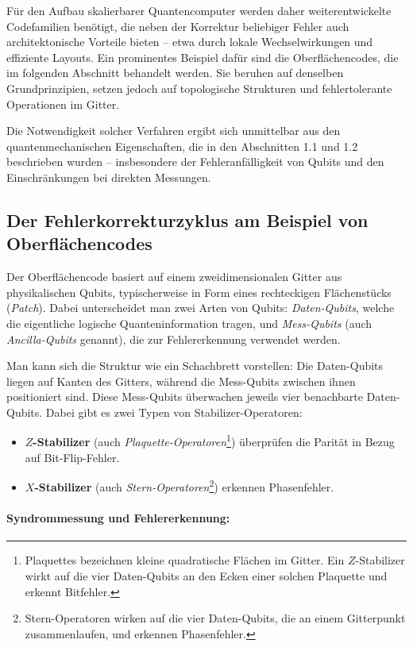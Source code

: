 Für den Aufbau skalierbarer Quantencomputer werden daher weiterentwickelte Codefamilien benötigt, die neben der Korrektur beliebiger Fehler auch architektonische Vorteile bieten – etwa durch lokale Wechselwirkungen und effiziente Layouts. Ein prominentes Beispiel dafür sind die Oberflächencodes, die im folgenden Abschnitt behandelt werden. Sie beruhen auf denselben Grundprinzipien, setzen jedoch auf topologische Strukturen und fehlertolerante Operationen im Gitter.

Die Notwendigkeit solcher Verfahren ergibt sich unmittelbar aus den quantenmechanischen Eigenschaften, die in den Abschnitten 1.1 und 1.2 beschrieben wurden – insbesondere der Fehleranfälligkeit von Qubits und den Einschränkungen bei direkten Messungen.

\subsection{Der Fehlerkorrekturzyklus am Beispiel von Oberflächencodes}

Der Oberflächencode basiert auf einem zweidimensionalen Gitter aus physikalischen Qubits, typischerweise in Form eines rechteckigen Flächenstücks (\emph{Patch}). Dabei unterscheidet man zwei Arten von Qubits: \emph{Daten-Qubits}, welche die eigentliche logische Quanteninformation tragen, und \emph{Mess-Qubits} (auch \emph{Ancilla-Qubits} genannt), die zur Fehlererkennung verwendet werden.

Man kann sich die Struktur wie ein Schachbrett vorstellen: Die Daten-Qubits liegen auf Kanten des Gitters, während die Mess-Qubits zwischen ihnen positioniert sind. Diese Mess-Qubits überwachen jeweils vier benachbarte Daten-Qubits. Dabei gibt es zwei Typen von Stabilizer-Operatoren:
\begin{itemize}
  \item \textbf{\(Z\)-Stabilizer} (auch \emph{Plaquette-Operatoren}\footnote{Plaquettes bezeichnen kleine quadratische Flächen im Gitter. Ein \(Z\)-Stabilizer wirkt auf die vier Daten-Qubits an den Ecken einer solchen Plaquette und erkennt Bitfehler.}) überprüfen die Parität in Bezug auf Bit-Flip-Fehler.
  \item \textbf{\(X\)-Stabilizer} (auch \emph{Stern-Operatoren}\footnote{Stern-Operatoren wirken auf die vier Daten-Qubits, die an einem Gitterpunkt zusammenlaufen, und erkennen Phasenfehler.}) erkennen Phasenfehler.
\end{itemize}

\paragraph{Syndrommessung und Fehlererkennung:}


